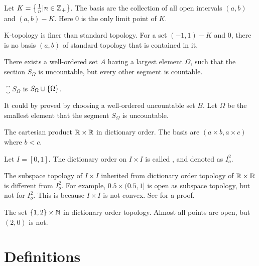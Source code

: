 \begin{definition}
    Let $K = \set{\frac{1}{n} | n \in \mathbb{Z}_{+}}$. The basis are the collection of all open intervals $(a,b)$ and $(a,b) - K$. Here $0$ is the only limit point of $K$.
    
    K-topology is finer than standard topology. For a set $(-1,1) - K$ and $0$, there is no basis $(a,b)$ of standard topology that is contained in it.
\end{definition}



\begin{definition}
    There exists a well-ordered set $A$ having a largest element $\Omega$, such that the section $S_\Omega$ is uncountable, but every other segment is countable.
    
    $\closure{S_\Omega}$ is $S_\Omega \cup \set{\Omega}$.
    
    It could by proved by choosing a well-ordered uncountable set $B$. Let $\Omega$ be the smallest element that the segment $S_\Omega$ is uncountable.
\end{definition}

\begin{example}[\cindex{$I_o^2$}]
    The cartesian product $\mathbb{R} \times \mathbb{R}$ in dictionary order. The basis are $(a\times b, a\times c)$ where $b < c$.
    
    Let $I=[0,1]$. The dictionary order on $I \times I$ is called , and denoted as $I_o^2$. 
    
    The subspace topology of $I \times I$ inherited from dictionary order topology of $\mathbb{R} \times \mathbb{R}$ is different from $I_o^2$. For example, $0.5 \times (0.5,1]$ is open as subspace topology, but not for $I_o^2$. This is because $I \times I$ is not convex. See  for a proof.
\end{example}

\begin{example}
    The set $\set{1,2} \times \mathbb{N}$ in dictionary order topology. Almost all points are open, but $(2,0)$ is not.
\end{example}




\section{Definitions}

